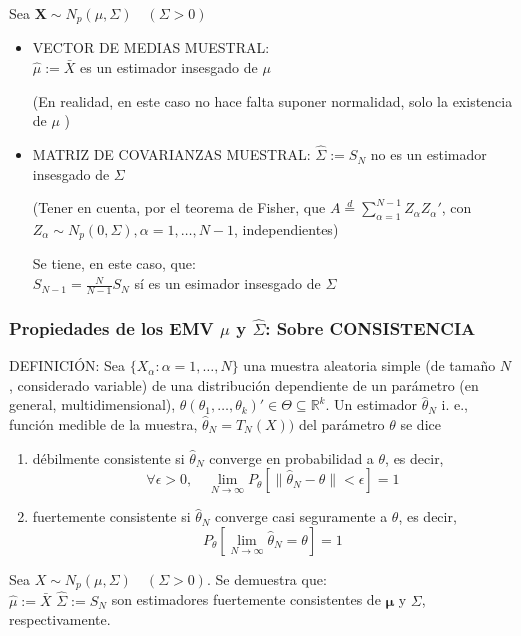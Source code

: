 \documentclass[11pt,a4paper]{article}
\begin{document}
Sea $\mathbf{X} \sim N_{p}(\mu, \Sigma) \quad(\Sigma>0)$

\begin{itemize}
\item VECTOR DE MEDIAS MUESTRAL: \\
$\hat{\mu}:=\bar{X}$ es un estimador insesgado de $\mu$

(En realidad, en este caso no hace falta suponer normalidad, solo la existencia de $\mu$ )

\item MATRIZ DE COVARIANZAS MUESTRAL:
$\hat{\Sigma}:=S_{N}$ no es un estimador insesgado de $\Sigma$

(Tener en cuenta, por el teorema de Fisher, que $A \stackrel{d}{=} \sum_{\alpha=1}^{N-1} Z_{\alpha} Z_{\alpha}'$, con $Z_{\alpha} \sim N_{p}(0, \Sigma), \alpha=1, \ldots, N-1$, independientes)

Se tiene, en este caso, que: \\
$S_{N-1}=\frac{N}{N-1} S_{N}$ sí es un esimador insesgado de $\Sigma$
\end{itemize}

\subsubsection{Propiedades de los EMV \texorpdfstring{$\hat{\mu}$}) y \texorpdfstring{$\hat{\Sigma}$}): Sobre CONSISTENCIA}
DEFINICIÓN: Sea $\{X_{\alpha}: \alpha=1, \ldots, N\}$ una muestra aleatoria simple (de tamaño $N$, considerado variable) de una distribución dependiente de un parámetro (en general, multidimensional), $\theta(\theta_{1}, \ldots, \theta_{k})' \in \Theta \subseteq \mathbb{R}^{k}$. Un estimador $\hat{\theta}_{N}$ i. e., función medible de la muestra, $\hat{\theta}_{N}=T_{N}(X))$ del parámetro $\theta$ se dice
\begin{enumerate}[label=(\alph*)]
\item débilmente consistente si $\hat{\theta}_{N}$ converge en probabilidad a $\theta$, es decir,
$$\forall \epsilon>0, \quad \lim\limits_{N \to \infty} P_{\theta} [\|\hat{\theta}_{N}-\theta\|<\epsilon]=1$$

\item fuertemente consistente si $\hat{\theta}_{N}$ converge casi seguramente a $\theta$, es decir,
$$P_{\theta} [\lim\limits_{N \to \infty} \hat{\theta}_{N}=\theta]=1$$
\end{enumerate}

Sea $X \sim N_{p}(\mu, \Sigma) \quad(\Sigma>0)$. Se demuestra que: \\
$\hat{\mu}:=\bar{X}$ $\hat{\Sigma}:=S_{N}$ son estimadores fuertemente consistentes de $\boldsymbol{\mu}$ y $\Sigma$, respectivamente.
\end{document}
